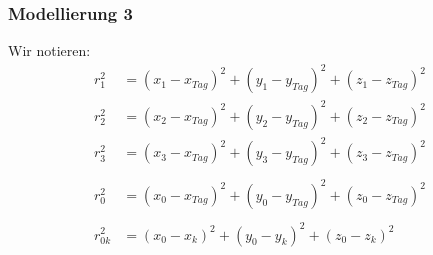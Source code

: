 \begin{frame}
  	\frametitle{Modellierung 3}
%  
	Wir notieren:
%	
	\begin{align}
		r_1^2&= (x_1-x_{Tag} )^2 + (y_1-y_{Tag} )^2 + (z_1-z_{Tag} )^2\\
		r_2^2&= (x_2-x_{Tag} )^2 + (y_2-y_{Tag} )^2 + (z_2-z_{Tag} )^2\\
		r_3^2&= (x_3-x_{Tag} )^2 + (y_3-y_{Tag} )^2 + (z_3-z_{Tag} )^2\\
		\nonumber\\
		r_0^2&= (x_0-x_{Tag} )^2 + (y_0-y_{Tag} )^2 + (z_0-z_{Tag} )^2\\
		\nonumber\\
		r_{0k}^2&= (x_0-x_k )^2 + (y_0-y_k )^2 + (z_0-z_k )^2
	\end{align}
%
\end{frame}